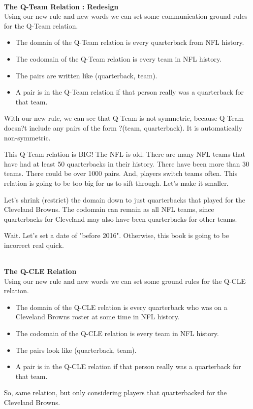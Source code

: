 \documentclass{ximera}
\begin{document}
\quad \\


\textbf{The Q-Team Relation : Redesign} \\
Using our new rule and new words we can set some communication ground rules for the Q-Team relation.


\begin{itemize}
 \item The domain of the Q-Team relation is every quarterback  from NFL history.
 \item The codomain of the Q-Team relation is every team in NFL history.
 \item The pairs are written like (quarterback, team).  
 \item  A pair is in the Q-Team relation if that person really was a quarterback for that team.
 \end{itemize}



With our new rule, we can see that Q-Team is not symmetric, because Q-Team doesn?t include any pairs of the form ?(team, quarterback). It is automatically non-symmetric.

This Q-Team relation is BIG! The NFL is old. There are many NFL teams that have had at least 50 quarterbacks in their history.  There have been more than 30 teams.  There could be over 1000 pairs.  And, players switch teams often.  This relation is going to be too big for us to sift through.  Let's make it smaller.

Let's shrink (restrict) the domain down to just quarterbacks that played for the Cleveland Browns. The codomain can remain as all NFL teams, since quarterbacks for Cleveland may also have been quarterbacks for other teams.

Wait. Let's set a date of "before 2016". Otherwise, this book is going to be incorrect real quick.

\quad \\

\textbf{The Q-CLE Relation} \\
Using our new rule and new words we can set some ground rules for the Q-CLE relation.
\begin{itemize}
\item The domain of the Q-CLE relation is every quarterback who was on a Cleveland Browns roster at some time in NFL history.
\item The codomain of the Q-CLE relation is every team in NFL history.
\item The pairs look like (quarterback, team).  
\item A pair is in the Q-CLE relation if that person really was a quarterback for that team.
\end{itemize}
So, same relation, but only considering players that quarterbacked for the Cleveland Browns.
\end{document}

